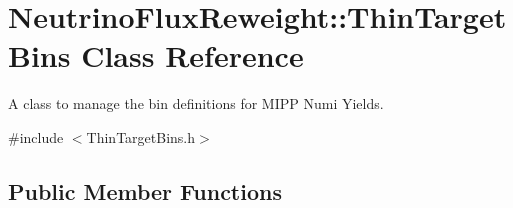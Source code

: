 \hypertarget{class_neutrino_flux_reweight_1_1_thin_target_bins}{\section{Neutrino\-Flux\-Reweight\-:\-:Thin\-Target\-Bins Class Reference}
\label{class_neutrino_flux_reweight_1_1_thin_target_bins}
}


A class to manage the bin definitions for M\-I\-P\-P Numi Yields.  




{\ttfamily \#include $<$Thin\-Target\-Bins.\-h$>$}

\subsection*{Public Member Functions}
